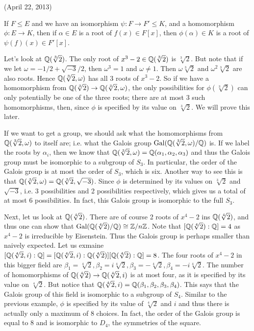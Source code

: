 \documentclass{../mathnotes}
\begin{document}
(April 22, 2013)

If $F\leq E$ and we have an isomorphism $\psi:F\to F'\leq K$, and a homomorphism $\phi: E\to K$, then if $\alpha\in E$ is a root of
$f(x)\in F[x]$, then $\phi(\alpha)\in K$ is a root of $\psi(f)(x)\in F'[x]$.

\begin{exmp}
    Let's look at $\mathbb{Q}(\sqrt[3]{2})$. The only root of $x^3-2\in\mathbb{Q}(\sqrt[3]{2})$ is $\sqrt[3]{2}$.
    But note that if we let $\omega=-1/2+\sqrt{-3}/2$, then $\omega^3=1$ and $\omega\neq 1$.
    Then $\omega\sqrt[3]{2}$ and $\omega^2\sqrt[3]{2}$ are also roots. Hence $\mathbb{Q}(\sqrt[3]{2},\omega)$
    has all 3 roots of $x^3-2$. So if we have a homomorphism from $\mathbb{Q}(\sqrt[3]{2})\to\mathbb{Q}(\sqrt[3]{2},\omega)$,
    the only possibilities for $\phi(\sqrt[3]{2})$ can only potentially be one of the three roots; there 
    are at most 3 such homomorphisms, then, since $\phi$ is specified by its value on $\sqrt[3]{2}$. We
    will prove this later.

    If we want to get a group, we should ask what the homomorphisms from $\mathbb{Q}(\sqrt[3]{2},\omega)$ to itself are; i.e. what
    the Galois group $\operatorname{Gal}(\mathbb{Q}(\sqrt[3]{2},\omega)/\mathbb{Q})$ is. If we label the roots by $\alpha_i$, then we know that
    $\mathbb{Q}(\sqrt[3]{2},\omega)=\mathbb{Q}(\alpha_1,\alpha_2,\alpha_3)$ and thus the Galois group must be isomorphic to a subgroup
    of $S_3$. In particular, the order of the Galois group is at most the order of $S_3$, which is six.
    Another way to see this is that $\mathbb{Q}(\sqrt[3]{2},\omega)=\mathbb{Q}(\sqrt[3]{2},\sqrt{-3})$. Since $\phi$ is determined
    by its values on $\sqrt[3]{2}$ and $\sqrt{-3}$, i.e. 3 possibilities and 2 possibilities respectively, which
    gives us a total of at most 6 possibilities. In fact, this Galois group is isomorphic to the full $S_3$.

    Next, let us look at $\mathbb{Q}(\sqrt[4]{2})$. There are of course 2 roots of $x^4-2$ ins $\mathbb{Q}(\sqrt[4]{2})$, and thus
    one can show that $\operatorname{Gal}(\mathbb{Q}(\sqrt[4]{2})/\mathbb{Q})\cong\mathbb{Z}/n\mathbb{Z}$. Note that $[\mathbb{Q}(\sqrt[4]{2}):\mathbb{Q}]=4$ as $x^4-2$ is irreducible
    by Eisenstein. Thus the Galois group is perhaps smaller than naively expected. Let us exmaine
    $[\mathbb{Q}(\sqrt[4]{2},i):\mathbb{Q}]=[\mathbb{Q}(\sqrt[4]{2},i):\mathbb{Q}(\sqrt[4]{2})][\mathbb{Q}(\sqrt[4]{2}):\mathbb{Q}]=8$. The four roots of $x^4-2$ in this bigger
    field are $\beta_1=\sqrt[4]{2},\beta_2=i\sqrt[4]{2},\beta_3=-\sqrt[4]{2},\beta_4=-i\sqrt[4]{2}$. The number
    of homomorphisms of $\mathbb{Q}(\sqrt[4]{2})\to\mathbb{Q}(\sqrt[4]{2},i)$ is at most four, as it is specified by its value on $\sqrt[4]{2}$.
    But notice that $\mathbb{Q}(\sqrt[4]{2},i)=\mathbb{Q}(\beta_1,\beta_2,\beta_3,\beta_4)$. This says that the Galois group of this field is
    isomorphic to a subgroup of $S_4$. Similar to the previous example, $\phi$ is specified by its value of $\sqrt[4]{2}$ and
    $i$ and thus there is actually only a maximum of 8 choices. In fact, the order of the Galois group is equal to 8 and
    is isomorphic to $D_4$, the symmetries of the square.
\end{exmp}
\end{document}
